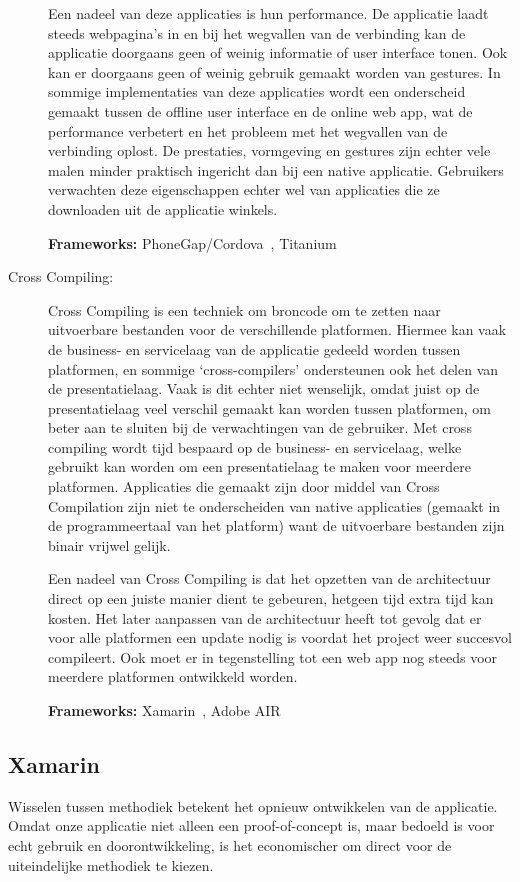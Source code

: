 \begin{description}
Een nadeel van deze applicaties is hun performance. De applicatie laadt steeds webpagina's in en bij het wegvallen van de verbinding kan de applicatie doorgaans geen of weinig informatie of user interface tonen. Ook kan er doorgaans geen of weinig gebruik gemaakt worden van gestures. In sommige implementaties van deze applicaties wordt een onderscheid gemaakt tussen de offline user interface en de online web app, wat de performance verbetert en het probleem met het wegvallen van de verbinding oplost. De prestaties, vormgeving en gestures zijn echter vele malen minder praktisch ingericht dan bij een native applicatie. Gebruikers verwachten deze eigenschappen echter wel van applicaties die ze downloaden uit de applicatie winkels.
    
\textbf{Frameworks:} PhoneGap/Cordova~\cite{cordova}, Titanium~\cite{titanium}
    
\item[Cross Compiling: ] Cross Compiling is een techniek om broncode om te zetten naar uitvoerbare bestanden voor de verschillende platformen. Hiermee kan vaak de business- en servicelaag van de applicatie gedeeld worden tussen platformen, en sommige `cross-compilers' ondersteunen ook het delen van de presentatielaag. Vaak is dit echter niet wenselijk, omdat juist op de presentatielaag veel verschil gemaakt kan worden tussen platformen, om beter aan te sluiten bij de verwachtingen van de gebruiker. Met cross compiling wordt tijd bespaard op de business- en servicelaag, welke gebruikt kan worden om een presentatielaag te maken voor meerdere platformen. Applicaties die gemaakt zijn door middel van Cross Compilation zijn niet te onderscheiden van native applicaties (gemaakt in de programmeertaal van het platform) want de uitvoerbare bestanden zijn binair vrijwel gelijk.
    
Een nadeel van Cross Compiling is dat het opzetten van de architectuur direct op een juiste manier dient te gebeuren, hetgeen tijd extra tijd kan kosten. Het later aanpassen van de architectuur heeft tot gevolg dat er voor alle platformen een update nodig is voordat het project weer succesvol compileert. Ook moet er in tegenstelling tot een web app nog steeds voor meerdere platformen ontwikkeld worden.
    
\textbf{Frameworks:} Xamarin~\cite{xamarin}, Adobe AIR~\cite{adobeair}
\end{description}

\subsection{Xamarin}
Wisselen tussen methodiek betekent het opnieuw ontwikkelen van de applicatie. Omdat onze applicatie niet alleen een proof-of-concept is, maar bedoeld is voor echt gebruik en doorontwikkeling, is het economischer om direct voor de uiteindelijke methodiek te kiezen.
    
